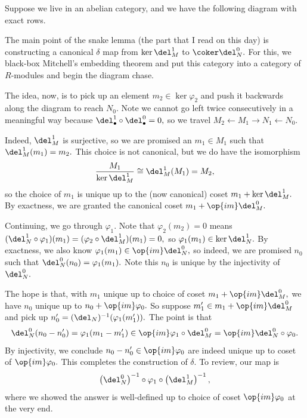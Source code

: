 Suppose we live in an abelian category, and we have the following diagram with exact rows.
\begin{center}
\end{center}
The main point of the snake lemma (the part that I read on this day) is constructing a canonical $\delta$ map from $\ker\del_M^1$ to $\coker\del_N^0.$ For this, we black-box Mitchell's embedding theorem and put this category into a category of $R$-modules and begin the diagram chase.

The idea, now, is to pick up an element $m_2\in\ker\varphi_2$ and push it backwards along the diagram to reach $N_0.$ Note we cannot go left twice consecutively in a meaningful way because $\del_\bullet^1\circ\del_\bullet^0=0,$ so we travel $M_2\leftarrow M_1\to N_1\leftarrow N_0.$

Indeed, $\del_M^1$ is surjective, so we are promised an $m_1\in M_1$ such that $\del_M^1(m_1)=m_2.$ This choice is not canonical, but we do have the isomorphism
\[\frac{M_1}{\ker\del_M^1}\cong\del_M^1(M_1)=M_2,\]
so the choice of $m_1$ is unique up to the (now canonical) coset $m_1+\ker\del_M^1.$ By exactness, we are granted the canonical coset $m_1+\op{im}\del_M^0.$

Continuing, we go through $\varphi_1.$ Note that $\varphi_2(m_2)=0$ means $(\del_N^1\circ\varphi_1)(m_1)=(\varphi_2\circ\del_M^1)(m_1)=0,$ so $\varphi_1(m_1)\in\ker\del_N^1.$ By exactness, we also know $\varphi_1(m_1)\in\op{im}\del_N^0,$ so indeed, we are promised $n_0$ such that $\del_N^0(n_0)=\varphi_1(m_1).$ Note this $n_0$ is unique by the injectivity of $\del_N^0.$

The hope is that, with $m_1$ unique up to choice of coset $m_1+\op{im}\del_M^0,$ we have $n_0$ unique up to $n_0+\op{im}\varphi_0.$ So suppose $m_1'\in m_1+\op{im}\del_M^0$ and pick up $n_0'=(\del_N)^{-1}(\varphi_1(m_1')).$ The point is that
\[\del_N^0(n_0-n_0')=\varphi_1(m_1-m_1')\in\op{im}\varphi_1\circ\del_M^0=\op{im}\del_N^0\circ\varphi_0.\]
By injectivity, we conclude $n_0-n_0'\in\op{im}\varphi_0$ are indeed unique up to coset of $\op{im}\varphi_0.$ This completes the construction of $\delta.$ To review, our map is
\[\left(\del_N^0\right)^{-1}\circ\varphi_1\circ\left(\del_M^1\right)^{-1},\]
where we showed the answer is well-defined up to choice of coset $\op{im}\varphi_0$ at the very end.

